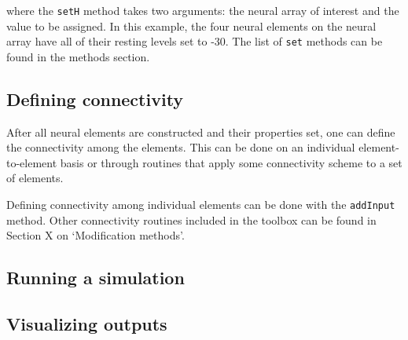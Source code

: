 \documentclass[phd, 12pt, doublespace, online]{fauthesis}
\begin{document}
\bigskip
{}

\bigskip
\noindent where the {\tt setH} method takes two arguments: the neural array of interest and the value to be assigned. In this example, the four neural elements on the neural array have all of their resting levels set to -30. The list of {\tt set} methods can be found in the methods section. 


\subsection{Defining connectivity}

After all neural elements are constructed and their properties set, one can define the connectivity among the elements. This can be done on an individual element-to-element basis or through routines that apply some connectivity scheme to a set of elements. 

Defining connectivity among individual elements can be done with the {\tt addInput} method. Other connectivity routines included in the toolbox can be found in Section X on `Modification methods'.

\subsection{Running a simulation}

\subsection{Visualizing outputs}
\end{document}
